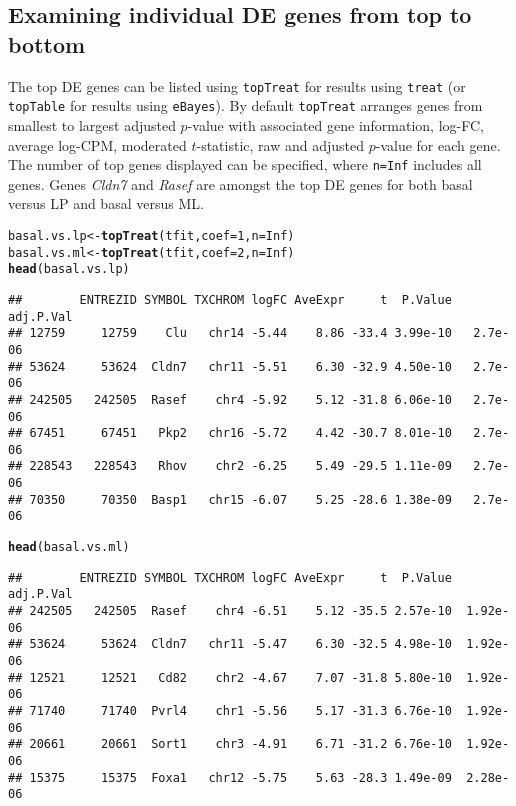 \documentclass[10pt,a4paper]{extarticle}\usepackage[]{graphicx}\usepackage[]{color}
\makeatletter
\newcommand{\hlnum}[1]{\textcolor[rgb]{0.686,0.059,0.569}{#1}}%
\newcommand{\hlstd}[1]{\textcolor[rgb]{0.345,0.345,0.345}{#1}}%
\newcommand{\hlkwb}[1]{\textcolor[rgb]{0.69,0.353,0.396}{#1}}%
\newcommand{\hlkwc}[1]{\textcolor[rgb]{0.333,0.667,0.333}{#1}}%
\newcommand{\hlkwd}[1]{\textcolor[rgb]{0.737,0.353,0.396}{\textbf{#1}}}%
\newenvironment{kframe}{%
 \def\at@end@of@kframe{}%
 \ifinner\ifhmode%
  \def\at@end@of@kframe{\end{minipage}}%
  \begin{minipage}{\columnwidth}%
 \fi\fi%
 \def\FrameCommand##1{\hskip\@totalleftmargin \hskip-\fboxsep
 \colorbox{shadecolor}{##1}\hskip-\fboxsep
     \hskip-\linewidth \hskip-\@totalleftmargin \hskip\columnwidth}%
 \MakeFramed {\advance\hsize-\width
   \@totalleftmargin\z@ \linewidth\hsize
   \@setminipage}}%
 {\par\unskip\endMakeFramed%
 \at@end@of@kframe}
\newenvironment{knitrout}{}{} %
\makeatother
\begin{document}
\subsection*{Examining individual DE genes from top to bottom}

The top DE genes can be listed using \texttt{topTreat} for results using \texttt{treat} (or \texttt{topTable} for results using \texttt{eBayes}). By default \texttt{topTreat} arranges genes from smallest to largest adjusted $p$-value with associated gene information, log-FC, average log-CPM, moderated $t$-statistic, raw and adjusted $p$-value for each gene. The number of top genes displayed can be specified, where \texttt{n=Inf} includes all genes. Genes \textit{Cldn7} and \textit{Rasef} are amongst the top DE genes for both basal versus LP and basal versus ML.
\newpage
\begin{knitrout}
\color{fgcolor}\begin{kframe}
\begin{alltt}
\hlstd{basal.vs.lp} \hlkwb{<-} \hlkwd{topTreat}\hlstd{(tfit,} \hlkwc{coef}\hlstd{=}\hlnum{1}\hlstd{,} \hlkwc{n}\hlstd{=}\hlnum{Inf}\hlstd{)}
\hlstd{basal.vs.ml} \hlkwb{<-} \hlkwd{topTreat}\hlstd{(tfit,} \hlkwc{coef}\hlstd{=}\hlnum{2}\hlstd{,} \hlkwc{n}\hlstd{=}\hlnum{Inf}\hlstd{)}
\hlkwd{head}\hlstd{(basal.vs.lp)}
\end{alltt}
\begin{verbatim}
##        ENTREZID SYMBOL TXCHROM logFC AveExpr     t  P.Value adj.P.Val
## 12759     12759    Clu   chr14 -5.44    8.86 -33.4 3.99e-10   2.7e-06
## 53624     53624  Cldn7   chr11 -5.51    6.30 -32.9 4.50e-10   2.7e-06
## 242505   242505  Rasef    chr4 -5.92    5.12 -31.8 6.06e-10   2.7e-06
## 67451     67451   Pkp2   chr16 -5.72    4.42 -30.7 8.01e-10   2.7e-06
## 228543   228543   Rhov    chr2 -6.25    5.49 -29.5 1.11e-09   2.7e-06
## 70350     70350  Basp1   chr15 -6.07    5.25 -28.6 1.38e-09   2.7e-06
\end{verbatim}
\begin{alltt}
\hlkwd{head}\hlstd{(basal.vs.ml)}
\end{alltt}
\begin{verbatim}
##        ENTREZID SYMBOL TXCHROM logFC AveExpr     t  P.Value adj.P.Val
## 242505   242505  Rasef    chr4 -6.51    5.12 -35.5 2.57e-10  1.92e-06
## 53624     53624  Cldn7   chr11 -5.47    6.30 -32.5 4.98e-10  1.92e-06
## 12521     12521   Cd82    chr2 -4.67    7.07 -31.8 5.80e-10  1.92e-06
## 71740     71740  Pvrl4    chr1 -5.56    5.17 -31.3 6.76e-10  1.92e-06
## 20661     20661  Sort1    chr3 -4.91    6.71 -31.2 6.76e-10  1.92e-06
## 15375     15375  Foxa1   chr12 -5.75    5.63 -28.3 1.49e-09  2.28e-06
\end{verbatim}
\end{kframe}
\end{knitrout}
\end{document}

